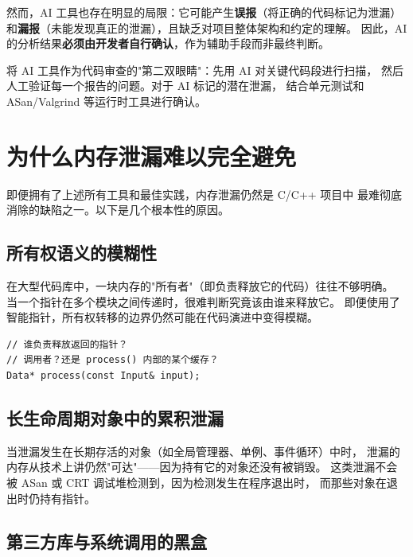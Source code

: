 \documentclass[12pt,a4paper,fontset=fandol]{ctexbook}
\begin{document}
然而，AI 工具也存在明显的局限：它可能产生\textbf{误报}（将正确的代码标记为泄漏）
和\textbf{漏报}（未能发现真正的泄漏），且缺乏对项目整体架构和约定的理解。
因此，AI 的分析结果\textbf{必须由开发者自行确认}，作为辅助手段而非最终判断。

\begin{note}[title={AI 辅助的最佳实践}]
将 AI 工具作为代码审查的"第二双眼睛"：先用 AI 对关键代码段进行扫描，
然后人工验证每一个报告的问题。对于 AI 标记的潜在泄漏，
结合单元测试和 ASan/Valgrind 等运行时工具进行确认。
\end{note}


\section{为什么内存泄漏难以完全避免}

即便拥有了上述所有工具和最佳实践，内存泄漏仍然是 C/C++ 项目中
最难彻底消除的缺陷之一。以下是几个根本性的原因。

\subsection{所有权语义的模糊性}

在大型代码库中，一块内存的"所有者"（即负责释放它的代码）往往不够明确。
当一个指针在多个模块之间传递时，很难判断究竟该由谁来释放它。
即便使用了智能指针，所有权转移的边界仍然可能在代码演进中变得模糊。

\begin{lstlisting}[style=cppstyle, caption={所有权歧义}]
// 谁负责释放返回的指针？
// 调用者？还是 process() 内部的某个缓存？
Data* process(const Input& input);
\end{lstlisting}

\subsection{长生命周期对象中的累积泄漏}

当泄漏发生在长期存活的对象（如全局管理器、单例、事件循环）中时，
泄漏的内存从技术上讲仍然"可达"——因为持有它的对象还没有被销毁。
这类泄漏不会被 ASan 或 CRT 调试堆检测到，因为检测发生在程序退出时，
而那些对象在退出时仍持有指针。

\subsection{第三方库与系统调用的黑盒}
\end{document}
